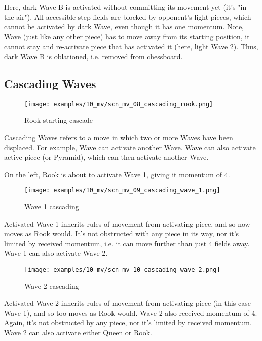 Here, dark Wave B is activated without committing its movement yet (it's "in-the-air").
All accessible step-fields are blocked by opponent's light pieces, which cannot be
activated by dark Wave, even though it has one momentum.
Note, Wave (just like any other piece) has to move away from its starting position,
it cannot stay and re-activate piece that has activated it (here, light Wave 2).
Thus, dark Wave B is oblationed, i.e. removed from chessboard.

\clearpage %

\subsection*{Cascading Waves}

\noindent
\begin{wrapfigure}[13]{l}{0.5625\textwidth}
\centering
\texttt{[image: examples/10\_mv/scn\_mv\_08\_cascading\_rook.png]}
\caption{Rook starting cascade}
\label{fig:scn_mv_08_cascading_rook}
\end{wrapfigure}
Cascading Waves refers to a move in which two or more Waves have been displaced.
For example, Wave can activate another Wave. Wave can also activate active
piece (or Pyramid), which can then activate another Wave.

On the left, Rook is about to activate Wave 1, giving it momentum of 4.

\vspace*{0.05\textheight}
\noindent
\begin{wrapfigure}[12]{r}{0.5625\textwidth}
\centering
\texttt{[image: examples/10\_mv/scn\_mv\_09\_cascading\_wave\_1.png]}
\caption{Wave 1 cascading}
\label{fig:scn_mv_09_cascading_wave_1}
\end{wrapfigure}
Activated Wave 1 inherits rules of movement from activating piece, and so now
moves as Rook would. It's not obstructed with any piece in its way, nor it's
limited by received momentum, i.e. it can move further than just 4 fields away.
Wave 1 can also activate Wave 2.

\clearpage %

\noindent
\begin{wrapfigure}[13]{l}{0.5625\textwidth}
\centering
\texttt{[image: examples/10\_mv/scn\_mv\_10\_cascading\_wave\_2.png]}
\caption{Wave 2 cascading}
\label{fig:scn_mv_10_cascading_wave_2}
\end{wrapfigure}
Activated Wave 2 inherits rules of movement from activating piece (in this
case Wave 1), and so too moves as Rook would. Wave 2 also received momentum
of 4. Again, it's not obstructed by any piece, nor it's limited by received
momentum. Wave 2 can also activate either Queen or Rook.

